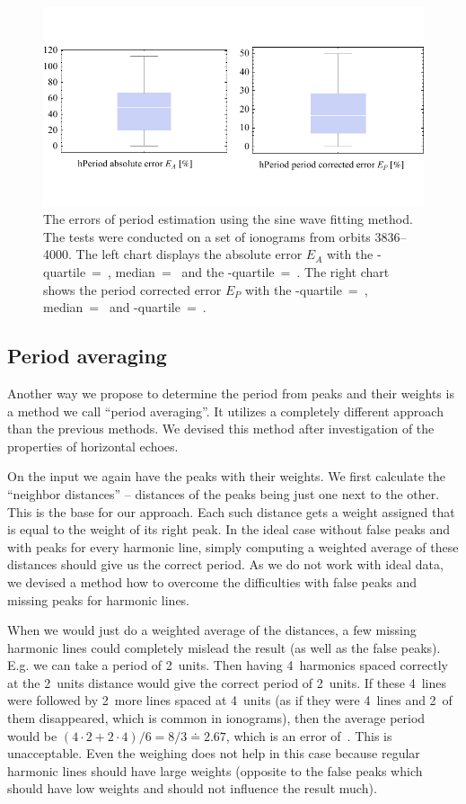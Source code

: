 \begin{figure}
	\centering
	\includegraphics[width=140mm]{images/fitting_errors.pdf}
	\caption{The errors of period estimation using the sine wave fitting method. The tests were conducted on a set of ionograms from orbits 3836--4000. The left chart displays the absolute error $E_A$ with the \mbox{-quartile}~=~, median~=~ and the \mbox{-quartile}~=~. The right chart shows the period corrected error $E_P$ with the \mbox{-quartile}~=~, median~=~ and \mbox{-quartile}~=~.}
	\label{fig:fitting_errors}
\end{figure}

\subsection{Period averaging}
Another way we propose to determine the period from peaks and their weights is a method we call ``period averaging''. It utilizes a completely different approach than the previous methods. We devised this method after investigation of the properties of horizontal echoes.

On the input we again have the peaks with their weights. We first calculate the ``neighbor distances'' -- distances of the peaks being just one next to the other. This is the base for our approach. Each such distance gets a weight assigned that is equal to the weight of its right peak. In the ideal case without false peaks and with peaks for every harmonic line, simply computing a weighted average of these distances should give us the correct period. As we do not work with ideal data, we devised a method how to overcome the difficulties with false peaks and missing peaks for harmonic lines.

When we would just do a weighted average of the distances, a few missing harmonic lines could completely mislead the result (as well as the false peaks). E.g. we can take a period of 2~units. Then having 4~harmonics spaced correctly at the 2~units distance would give the correct period of 2~units. If these 4~lines were followed by 2~more lines spaced at 4~units (as if they were 4~lines and 2~of them disappeared, which is common in ionograms), then the average period would be $(4\cdot 2 + 2 \cdot 4)/6 = 8/3 \doteq 2.67$, which is an error of~. This is unacceptable. Even the weighing does not help in this case because regular harmonic lines should have large weights (opposite to the false peaks which should have low weights and should not influence the result much).

